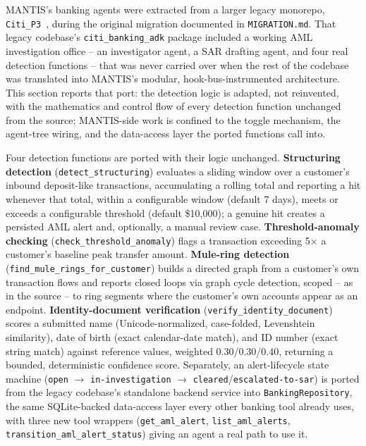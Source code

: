 \documentclass[conference]{IEEEtran}
\begin{document}
MANTIS's banking agents were extracted from a larger legacy monorepo, \texttt{Citi\_P3}~\cite{citi_p3_repo}, during the original migration documented in \texttt{MIGRATION.md}. That legacy codebase's \texttt{citi\_banking\_adk} package included a working AML investigation office -- an investigator agent, a SAR drafting agent, and four real detection functions -- that was never carried over when the rest of the codebase was translated into MANTIS's modular, hook-bus-instrumented architecture. This section reports that port: the detection logic is adapted, not reinvented, with the mathematics and control flow of every detection function unchanged from the source; MANTIS-side work is confined to the toggle mechanism, the agent-tree wiring, and the data-access layer the ported functions call into.

Four detection functions are ported with their logic unchanged. \textbf{Structuring detection} (\texttt{detect\_structuring}) evaluates a sliding window over a customer's inbound deposit-like transactions, accumulating a rolling total and reporting a hit whenever that total, within a configurable window (default 7 days), meets or exceeds a configurable threshold (default \$10{,}000); a genuine hit creates a persisted AML alert and, optionally, a manual review case. \textbf{Threshold-anomaly checking} (\texttt{check\_threshold\_anomaly}) flags a transaction exceeding 5$\times$ a customer's baseline peak transfer amount. \textbf{Mule-ring detection} (\texttt{find\_mule\_rings\_for\_customer}) builds a directed graph from a customer's own transaction flows and reports closed loops via graph cycle detection, scoped -- as in the source -- to ring segments where the customer's own accounts appear as an endpoint. \textbf{Identity-document verification} (\texttt{verify\_identity\_document}) scores a submitted name (Unicode-normalized, case-folded, Levenshtein similarity), date of birth (exact calendar-date match), and ID number (exact string match) against reference values, weighted 0.30/0.30/0.40, returning a bounded, deterministic confidence score. Separately, an alert-lifecycle state machine (\texttt{open} $\rightarrow$ \texttt{in-investigation} $\rightarrow$ \texttt{cleared}/\texttt{escalated-to-sar}) is ported from the legacy codebase's standalone backend service into \texttt{BankingRepository}, the same SQLite-backed data-access layer every other banking tool already uses, with three new tool wrappers (\texttt{get\_aml\_alert}, \texttt{list\_aml\_alerts}, \texttt{transition\_aml\_alert\_status}) giving an agent a real path to use it.
\end{document}
